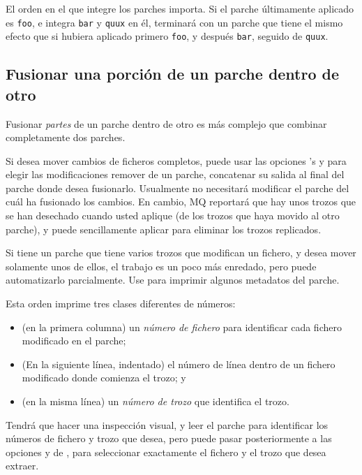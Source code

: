 El orden en el que integre los parches importa.  Si el parche
últimamente aplicado es \texttt{foo}, e integra  \texttt{bar} y
\texttt{quux} en él, terminará con un parche que tiene el mismo efecto
que si hubiera aplicado primero \texttt{foo}, y después \texttt{bar},
seguido de \texttt{quux}.

\subsection{Fusionar una porción de un parche dentro de otro}

Fusionar \emph{partes} de un parche dentro de otro es más complejo que
combinar completamente dos parches.

Si desea mover cambios de ficheros completos, puede usar las opciones
's  y
 para elegir las modificaciones remover de un
parche, concatenar su salida al final del parche donde desea
fusionarlo.  Usualmente no necesitará modificar el parche del cuál ha
fusionado los cambios.  En cambio, MQ reportará que hay unos trozos
que se han desechado cuando usted aplique (de los
trozos que haya movido al otro parche), y puede sencillamente aplicar
 para eliminar los trozos replicados.

Si tiene un parche que tiene varios trozos que modifican un fichero, y
desea mover solamente unos de ellos, el trabajo es un poco más
enredado, pero puede automatizarlo parcialmente.  Use
 para imprimir algunos metadatos del parche.

Esta orden imprime tres clases diferentes de números:
\begin{itemize}
\item (en la primera columna) un \emph{número de fichero} para
  identificar cada fichero modificado en el parche;
\item (En la siguiente línea, indentado) el número de línea dentro de
  un fichero modificado donde comienza el trozo; y
\item (en la misma línea) un \emph{número de trozo} que identifica el
  trozo.
\end{itemize}

Tendrá que hacer una inspección visual, y leer el parche para
identificar los números de fichero y trozo que desea, pero puede pasar
posteriormente a las opciones  y 
 de , para seleccionar
exactamente el fichero y el trozo que desea extraer.

